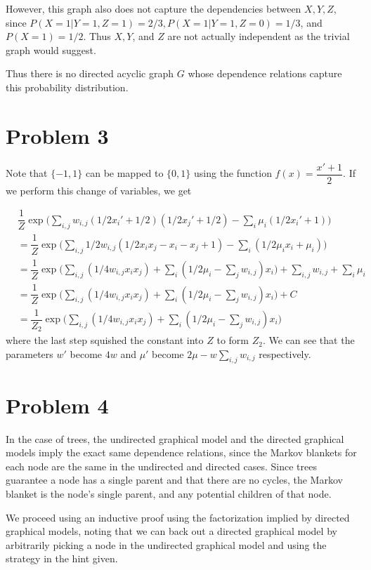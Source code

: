 \documentclass{article}
\begin{document}
However, this graph also does not capture the dependencies between $X, Y, Z$, since $P(X = 1 | Y = 1, Z = 1) = 2/3, P(X = 1 | Y = 1, Z = 0) = 1/3$, and $P(X = 1) = 1/2$. Thus $X, Y$, and $Z$ are not actually independent as the trivial graph would suggest.

Thus there is no directed acyclic graph $G$ whose dependence relations capture this probability distribution.

\section{Problem 3}
Note that $\{-1, 1\}$ can be mapped to $\{0, 1\}$ using the function $f(x) = \dfrac{x' + 1}{2}$. If we perform this change of variables, we get 

\begin{align}
  &\dfrac{1}{Z} \exp \big(\sum_{i,j} w_{i,j} (1/2x_i' + 1/2)(1/2x_j' + 1/2) - \sum_i \mu_i(1/2x_i'+1)\big) \\
&= \dfrac{1}{Z} \exp \big(\sum_{i,j} 1/2 w_{i,j} (1/2x_ix_j - x_i  - x_j + 1) - \sum_i (1/2 \mu_i x_i + \mu_i) \big) \\ 
&= \dfrac{1}{Z}\exp \big(\sum_{i, j} (1/4w_{i,j}x_ix_j )+ \sum_i(1/2\mu_i - \sum_{j}w_{i,j}) x_i)+ \sum_{i,j} w_{i,j} + \sum_i \mu_i \\
&= \dfrac{1}{Z}\exp \big(\sum_{i, j} (1/4w_{i,j}x_ix_j )+ \sum_i(1/2\mu_i - \sum_{j}w_{i,j}) x_i)+ C \\
&= \dfrac{1}{Z_2}\exp \big(\sum_{i, j} (1/4w_{i,j}x_ix_j )+ \sum_i(1/2\mu_i - \sum_{j}w_{i,j}) x_i)
\end{align}
 where the last step squished the constant into $Z$ to form $Z_2$. We can see that the parameters $w'$ become $4w$ and $\mu'$ become $2\mu - w\sum_{i,j}w_{i,j}$ respectively.

\section{Problem 4}

In the case of trees, the undirected graphical model and the directed graphical models imply the exact same dependence relations, since the Markov blankets for each node are the same in the undirected and directed cases. Since trees guarantee a node has a single parent and that there are no cycles, the Markov blanket is the node's single parent, and any potential children of that node.

We proceed using an inductive proof using the factorization implied by directed graphical models, noting that we can back out a directed graphical model by arbitrarily picking a node in the undirected graphical model and using the strategy in the hint given.
\end{document}
